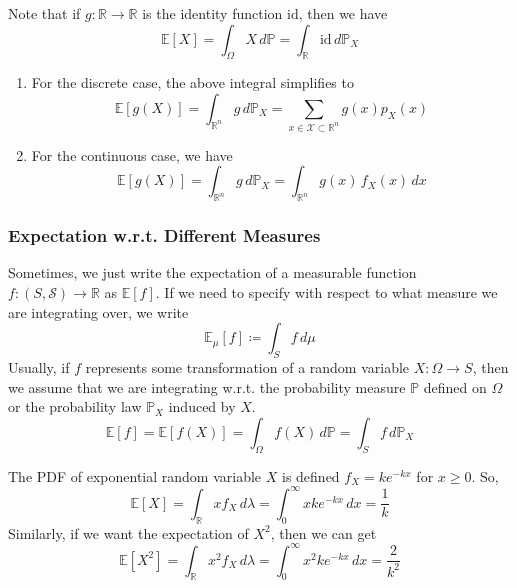 \documentclass{article}
\begin{document}
      Note that if $g: \mathbb{R} \rightarrow \mathbb{R}$ is the identity function $\mathrm{id}$, then we have 
      \begin{equation}
        \mathbb{E}[X] = \int_\Omega X \,d\mathbb{P} = \int_{\mathbb{R}} \mathrm{id} \, d\mathbb{P}_X
      \end{equation}
      \begin{enumerate}
        \item For the discrete case, the above integral simplifies to 
        \begin{equation}
          \mathbb{E}[g(X)] = \int_{\mathbb{R}^n} g \,d \mathbb{P}_X = \sum_{x \in \mathcal{X} \subset \mathbb{R}^n} g(x) p_X (x)
        \end{equation}
        
        \item For the continuous case, we have 
        \begin{equation}
          \mathbb{E}[g(X)] = \int_{\mathbb{R}^n} g \,d \mathbb{P}_X = \int_{\mathbb{R}^n} g (x) \, f_X (x) \,dx
        \end{equation}
      \end{enumerate}

    \subsubsection{Expectation w.r.t. Different Measures}

      Sometimes, we just write the expectation of a measurable function $f: (S, \mathcal{S}) \rightarrow \mathbb{R}$ as $\mathbb{E}[f]$. If we need to specify with respect to what measure we are integrating over, we write 
      \begin{equation}
        \mathbb{E}_\mu [f] \coloneqq \int_S f \, d\mu
      \end{equation}
      Usually, if $f$ represents some transformation of a random variable $X: \Omega \rightarrow S$, then we assume that we are integrating w.r.t. the probability measure $\mathbb{P}$ defined on $\Omega$ or the probability law $\mathbb{P}_X$ induced by $X$. 
      \begin{equation}
        \mathbb{E}[f] = \mathbb{E}[f(X)] = \int_\Omega f(X) \,d\mathbb{P} = \int_S f \,d\mathbb{P}_X
      \end{equation}

      \begin{example}
      The PDF of exponential random variable $X$ is defined $f_X = k e^{-k x}$ for $x \geq 0$. So, 
      \begin{equation}
        \mathbb{E}[X] = \int_\mathbb{R} x f_X \, d\lambda = \int_0^\infty x k e^{-k x} \, dx = \frac{1}{k}
      \end{equation}
      Similarly, if we want the expectation of $X^2$, then we can get 
      \begin{equation}
        \mathbb{E}[X^2] = \int_\mathbb{R} x^2 f_X \,d\lambda = \int_0^\infty x^2 k e^{-k x} \,dx = \frac{2}{k^2}
      \end{equation}
      \end{example} 
\end{document}
